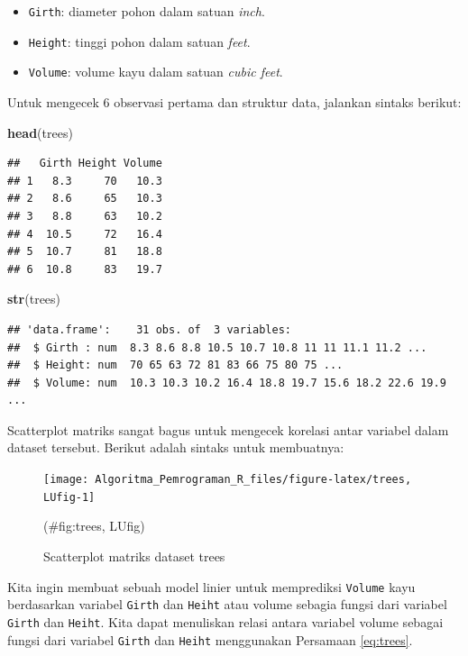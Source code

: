 \documentclass[
]{book}
\newenvironment{Shaded}{\begin{snugshade}}{\end{snugshade}}
\newcommand{\FunctionTok}[1]{\textcolor[rgb]{0.13,0.29,0.53}{\textbf{#1}}}
\newcommand{\NormalTok}[1]{#1}
\providecommand{\tightlist}{%
  \setlength{\itemsep}{0pt}\setlength{\parskip}{0pt}}
\theoremstyle{definition}
\theoremstyle{definition}
\theoremstyle{definition}
\theoremstyle{definition}
\theoremstyle{remark}
\begin{document}
\begin{itemize}
\tightlist
\item
  \texttt{Girth}: diameter pohon dalam satuan \emph{inch}.
\item
  \texttt{Height}: tinggi pohon dalam satuan \emph{feet}.
\item
  \texttt{Volume}: volume kayu dalam satuan \emph{cubic feet}.
\end{itemize}

Untuk mengecek 6 observasi pertama dan struktur data, jalankan sintaks berikut:

\begin{Shaded}
\begin{Highlighting}[]
\FunctionTok{head}\NormalTok{(trees)}
\end{Highlighting}
\end{Shaded}

\begin{verbatim}
##   Girth Height Volume
## 1   8.3     70   10.3
## 2   8.6     65   10.3
## 3   8.8     63   10.2
## 4  10.5     72   16.4
## 5  10.7     81   18.8
## 6  10.8     83   19.7
\end{verbatim}

\begin{Shaded}
\begin{Highlighting}[]
\FunctionTok{str}\NormalTok{(trees)}
\end{Highlighting}
\end{Shaded}

\begin{verbatim}
## 'data.frame':    31 obs. of  3 variables:
##  $ Girth : num  8.3 8.6 8.8 10.5 10.7 10.8 11 11 11.1 11.2 ...
##  $ Height: num  70 65 63 72 81 83 66 75 80 75 ...
##  $ Volume: num  10.3 10.3 10.2 16.4 18.8 19.7 15.6 18.2 22.6 19.9 ...
\end{verbatim}

Scatterplot matriks sangat bagus untuk mengecek korelasi antar variabel dalam dataset tersebut. Berikut adalah sintaks untuk membuatnya:

\begin{figure}

{\centering \texttt{[image: Algoritma\_Pemrograman\_R\_files/figure-latex/trees, LUfig-1]} 

}

\caption{Scatterplot matriks dataset trees}(\#fig:trees, LUfig)
\end{figure}

Kita ingin membuat sebuah model linier untuk memprediksi \texttt{Volume} kayu berdasarkan variabel \texttt{Girth} dan \texttt{Heiht} atau volume sebagia fungsi dari variabel \texttt{Girth} dan \texttt{Heiht}. Kita dapat menuliskan relasi antara variabel volume sebagai fungsi dari variabel \texttt{Girth} dan \texttt{Heiht} menggunakan Persamaan \eqref{eq:trees}.
\end{document}
